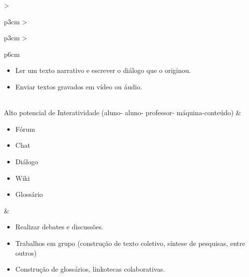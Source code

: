 \begin{table}[htpb]
\begin{threeparttable}
\begin{tabular}{>{\raggedright\arraybackslash}p{3cm} >{\raggedright\arraybackslash}p{3cm} >{\raggedright\arraybackslash}p{6cm}}
\begin{minipage}[t]{\linewidth}
\begin{itemize}[leftmargin=*,topsep=-0pt,partopsep=0pt,parsep=0pt,itemsep=0pt]
    \item Ler um texto narrativo e escrever o diálogo que o originou.
    \item Enviar textos gravados em vídeo ou áudio.
\end{itemize} 
\end{minipage}
\\
Alto potencial de Interatividade (aluno- aluno- professor- máquina-conteúdo) &
\begin{minipage}[t]{\linewidth}
\begin{itemize}[leftmargin=*,topsep=-0pt,partopsep=0pt,parsep=0pt,itemsep=0pt]
    \item Fórum
    \item Chat
    \item Diálogo
    \item Wiki
    \item Glossário
\end{itemize} 
\end{minipage}
&
\begin{minipage}[t]{\linewidth}
\begin{itemize}[leftmargin=*,topsep=-0pt,partopsep=0pt,parsep=0pt,itemsep=0pt]
    \item Realizar debates e discussões.
    \item Trabalhos em grupo (construção de texto coletivo, síntese de pesquisas, entre outros)
    \item Construção de glossários, linkotecas colaborativas.
\end{itemize}  
\end{minipage}
\\
\bottomrule
\end{tabular}
\end{threeparttable}
\end{table}

